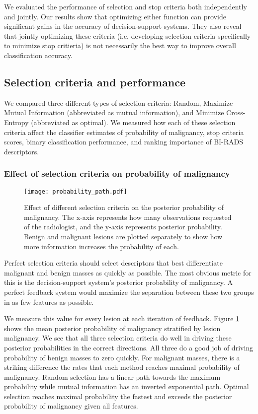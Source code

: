 We evaluated the performance of selection and stop criteria both independently and jointly. Our results show that optimizing either function can provide significant gains in the accuracy of decision-support systems. They also reveal that jointly optimizing these criteria (i.e. developing selection criteria specifically to minimize stop critieria) is not necessarily the best way to improve overall classification accuracy.

\subsection{Selection criteria and performance}
We compared three different types of selection criteria: Random, Maximize Mutual Information (abbreviated as mutual information), and Minimize Cross-Entropy (abbreviated as optimal). We measured how each of these selection criteria affect the classifier estimates of probability of malignancy, stop criteria scores, binary classification performance, and ranking importance of BI-RADS descriptors.  

\subsubsection{Effect of selection criteria on probability of malignancy}

\begin{figure}[h]
	\centering
	\texttt{[image: probability\_path.pdf]}
	\caption[Effect of selection criteria on probability of malignancy]{Effect of different selection criteria on the posterior probability of malignancy. The x-axis represents how many observations requested of the radiologist, and the y-axis represents posterior probability. Benign and malignant lesions are plotted separately to show how more information increases the probability of each. }
	\label{fig:feedback_mammo}
\end{figure}


Perfect selection criteria should select descriptors that best differentiate malignant and benign masses as quickly as possible. The most obvious metric for this is the decision-support system's posterior probability of malignancy.  A perfect feedback system would maximize the separation between these two groups in as few features as possible.

We measure this value for every lesion at each iteration of feedback. Figure \ref{fig:feedback_mammo} shows the mean posterior probability of malignancy stratified by lesion malignancy. We see that all three selection criteria do well in driving these posterior probabilities in the correct directions. All three do a good job of driving probability of benign masses to zero quickly. For malignant masses, there is a striking difference the rates that each method reaches maximal probability of malignancy. Random selection has a linear path towards the maximum probability while mutual information has an inverted exponential path. Optimal selection reaches maximal probability the fastest and exceeds the posterior probability of malignancy given all features.

